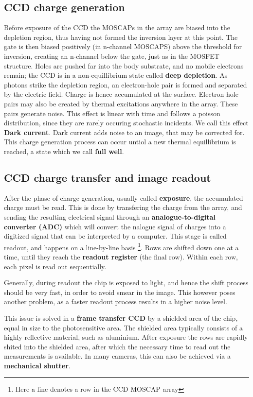 \documentclass[../main.tex]{subfiles}
\begin{document}
	\subsection{CCD charge generation}
	Before exposure of the CCD the MOSCAPs in the array are biased into the depletion region, thus having not formed the inversion layer at this point. The gate is then biased positively (in n-channel MOSCAPS) above the threshold for inversion, creating an n-channel below the gate, just as in the MOSFET structure. Holes are pushed far into the body substrate, and no mobile electrons remain; the CCD is in a non-equillibrium state called \textbf{deep depletion}. As photons strike the depletion region, an electron-hole pair is formed and separated by the electric field. Charge is hence accumulated at the surface. Electron-hole pairs may also be created by thermal excitations anywhere in the array. These pairs generate noise. This effect is linear with time and follows a poisson distribution, since they are rarely occuring stochastic incidents. We call this effect \textbf{Dark current}. Dark current adds noise to an image, that may be corrected for. This charge generation process can occur untiol a new thermal equillibrium is reached, a state which we call \textbf{full well}. 
	
	\subsection{CCD charge transfer and image readout}
	After the phase of charge generation, usually called \textbf{exposure}, the accumulated charge must be read. This is done by transfering the charge from the array, and sending the resulting electrical signal through an \textbf{analogue-to-digital converter (ADC)} which will convert the nalogue signal of charges into a digitized signal that can be interpreted by a computer. This stage is called readout, and happens on a line-by-line basis \footnote{Here a line denotes a row in the CCD MOSCAP array}. Rows are shifted down one at a time, until they reach the \textbf{readout register} (the final row). Within each row, each pixel is read out sequentially.  
	
	Generally, during readout the chip is exposed to light, and hence the shift process should be very fast, in order to avoid smear in the image. This however poses another problem, as a faster readout process results in a higher noise level. 
	
	This issue is solved in a \textbf{frame transfer CCD} by a shielded area of the chip, equal in size to the photosensitive area. The shielded area typically consists of a highly reflective material, such as aluminium. After exposure the rows are rapidly shited into the shielded area, after which the necessary time to read out the measurements is available. In many cameras, this can also be achieved via a \textbf{mechanical shutter}. 
	
\end{document}
